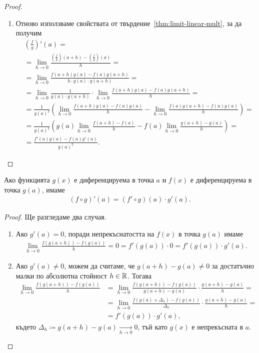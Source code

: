 \documentclass[numbers=endperiod, bibliography=totocnumbered]{scrartcl}
\begin{document}
\begin{proof}
\begin{enumerate}
    \item Отново използваме свойствата от твърдение~\ref{thm:limit-linear-mult}, за да получим
    \begin{align*}
      &\left( \frac f g \right)'(a)
      = \\ &=
      \lim_{h \to 0} \frac {\left(\frac f g \right)(a+h) - \left(\frac f g \right)(a)} h
      = \\ &=
      \lim_{h \to 0} \frac {f(a+h) g(a) - f(a) g(a+h)} {h \cdot g(a) \cdot g(a+h)}
      = \\ &=
      \lim_{h \to 0} \frac 1 {g(a) \cdot g(a+h)} \cdot \lim_{h \to 0} \frac {f(a+h) g(a) - f(a) g(a+h)} h
      = \\ &=
      \frac 1 {{g(a)}^2} \left( \lim_{h \to 0} \frac {f(a+h) g(a) - f(a) g(a)} h - \lim_{h \to 0} \frac {f(a) g(a+h) - f(a) g(a)} h \right)
      = \\ &=
      \frac 1 {{g(a)}^2} \left( g(a) \lim_{h \to 0} \frac {f(a+h) - f(a)} h - f(a) \lim_{h \to 0} \frac {g(a+h) - g(a)} h \right)
      = \\ &=
      \frac {f'(a) g(a) - f(a) g'(a)} {{g(a)}^2}.
    \end{align*}
  \end{enumerate}
\end{proof}

\begin{theorem}\label{thm:chain-rule}
  Ако функцията \( g(x) \) е диференцируема в точка \( a \) и \( f(x) \) е диференцируема в точка \( g(a) \), имаме
  \begin{align*}
    (f \circ g)'(a) = (f' \circ g)(a) \cdot g'(a).
  \end{align*}
\end{theorem}
\begin{proof}
  Ще разгледаме два случая.

  \begin{enumerate}
    \item Ако \( g'(a) = 0 \), поради непрекъснатостта на \( f(x) \) в точка \( g(a) \) имаме
    \begin{align*}
      \lim_{h \to 0} \frac {f(g(a+h)) - f(g(a))} h
      =
      0
      =
      f'(g(a)) \cdot 0
      =
      f'(g(a)) \cdot g'(a).
    \end{align*}

    \item Ако \( g'(a) \neq 0 \), можем да считаме, че \( g(a+h) - g(a) \neq 0 \) за достатъчно малки по абсолютна стойност \( h \in \mathbb{R} \). Тогава
    \begin{align*}
      \lim_{h \to 0} \frac {f(g(a+h)) - f(g(a))} h
      &=
      \lim_{h \to 0} \frac {f(g(a+h)) - f(g(a))} {g(a+h) - g(a)} \cdot \frac {g(a+h) - g(a)} h
      = \\ &=
      \lim_{h \to 0} \frac {f(g(a) + \Delta_h) - f(g(a))} {\Delta_h} \cdot \frac {g(a+h) - g(a)} h
      = \\ &=
      f'(g(a)) \cdot g'(a),
    \end{align*}
    където \( \Delta_h \coloneqq g(a+h) - g(a) \underset {h \to 0} \longrightarrow 0 \), тъй като \( g(x) \) е непрекъсната в \( a \).
  \end{enumerate}
\end{proof}
\end{document}
